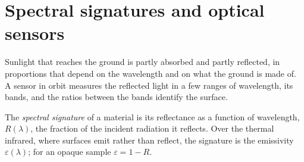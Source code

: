 \section{Spectral signatures and optical sensors}\label{sec:b3:remote-sensing-gis:optical}

Sunlight that reaches the ground is partly absorbed and partly reflected,
in proportions that depend on the wavelength and on what the ground is
made of. A sensor in orbit measures the reflected light in a few ranges of
wavelength, its bands, and the ratios between the bands identify the
surface.

\begin{definition}\label{def:b3:remote-sensing-gis:signature}
The \emph{spectral signature} of a material is
its reflectance as a function of wavelength, $R(\lambda)$, the fraction of
the incident radiation it reflects. Over the thermal infrared, where
surfaces emit rather than reflect, the signature is the emissivity
$\varepsilon(\lambda)$; for an opaque sample $\varepsilon = 1 - R$.
\end{definition}

